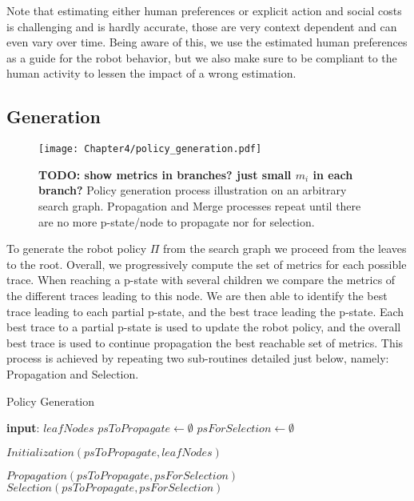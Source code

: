 Note that estimating either human preferences or explicit action and social costs is challenging and is hardly accurate, those are very context dependent and can even vary over time.
Being aware of this, we use the estimated human preferences as a guide for the robot behavior, but we also make sure to be compliant to the human activity to lessen the impact of a wrong estimation. 

    \subsection{Generation}

\begin{figure}
    \texttt{[image: Chapter4/policy\_generation.pdf]}
    \caption{\textbf{TODO: show metrics in branches? just small $m_i$ in each branch?} Policy generation process illustration on an arbitrary search graph. Propagation and Merge processes repeat until there are no more p-state/node to propagate nor for selection.}
    \label{fig:policy_generation}
\end{figure}

To generate the robot policy $\Pi$ from the search graph we proceed from the leaves to the root. 
Overall, we progressively compute the set of metrics for each possible trace. When reaching a p-state with several children we compare the metrics of the different traces leading to this node. We are then able to identify the best trace leading to each partial p-state, and the best trace leading the p-state. Each best trace to a partial p-state is used to update the robot policy, and the overall best trace is used to continue propagation the best reachable set of metrics.
This process is achieved by repeating two sub-routines detailed just below, namely: Propagation and Selection. 

\begin{algorithm}
\caption{Policy Generation}\label{alg:policy_generation}
\begin{algorithmic}[1]

\State \textbf{input}: $leafNodes$ 
\State $psToPropagate \gets \emptyset$
\State $psForSelection \gets \emptyset$

\State $Initialization(psToPropagate, leafNodes)$

    \State $Propagation(psToPropagate, psForSelection)$
    \State $Selection(psToPropagate, psForSelection)$
\EndWhile

\end{algorithmic}
\end{algorithm}

